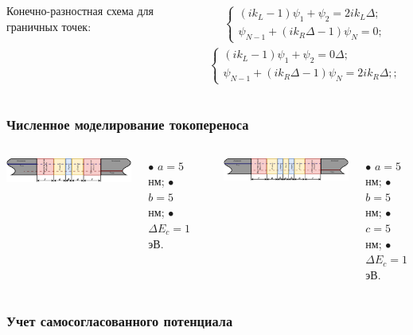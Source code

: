 \documentclass[10pt,pdf,hyperref={unicode},aspectratio={169}]{beamer}
\begin{document}
\begin{frame}
\begin{columns}
{\color{red}Конечно-разностная схема для граничных точек:}
\begin{columns}
	\footnotesize
	\begin{gather*}
		\begin{cases}
			(ik_{L}-1)\psi_{1} + \psi_{2} = 2ik_{L}\Delta;\\
			\psi_{N-1} + (ik_{R}\Delta - 1)\psi_{N} = 0;
		\end{cases}
	\end{gather*}
	\footnotesize
	\begin{gather*}
		\begin{cases}
			(ik_{L}-1)\psi_{1} + \psi_{2} = 0\Delta;\\
			\psi_{N-1} + (ik_{R}\Delta - 1)\psi_{N} = 2ik_{R}\Delta;;
		\end{cases}
	\end{gather*}
\end{columns}
\end{columns}
\end{frame}

\begin{frame}
	\frametitle{Численное моделирование токопереноса}
	\begin{columns}
	   	\includegraphics[width=\linewidth]{assets/BHS}

		{\scriptsize $\bullet$ $a = 5$ нм; $\bullet$ $b = 5$ нм; $\bullet$ $\Delta E_{c} = 1$эВ.}
		\rule[1mm]{0.2ex}{70mm}
	   	\includegraphics[width=\linewidth]{assets/RTHS}

		{\scriptsize $\bullet$ $a = 5$ нм; $\bullet$ $b = 5$ нм; $\bullet$ $c = 5$ нм; $\bullet$ $\Delta E_{c} = 1$эВ.}
	\end{columns}
\end{frame}

\begin{frame}
	\frametitle{Учет самосогласованного потенциала}
	
\end{frame}
\end{document}
